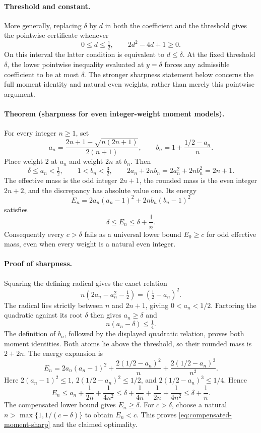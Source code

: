 \paragraph{Threshold and constant.}
More generally, replacing \(\delta\) by \(d\) in both the coefficient
and the threshold gives the pointwise certificate whenever
\[
 0\le d\le\tfrac12,\qquad 2d^2-4d+1\ge0.
\]
On this interval the latter condition is equivalent to \(d\le\delta\).
At the fixed threshold \(\delta\), the lower pointwise inequality
evaluated at \(y=\delta\) forces any admissible coefficient to be at
most \(\delta\).  The stronger sharpness statement below concerns
the full moment identity and natural even weights, rather than merely
this pointwise argument.

\paragraph{Theorem (sharpness for even integer-weight moment models).}
For every integer \(n\ge1\), set
\[
 a_n=\frac{2n+1-\sqrt{n(2n+1)}}{2(n+1)},\qquad
 b_n=1+\frac{1/2-a_n}{n}.
\]
Place weight \(2\) at \(a_n\) and weight \(2n\) at \(b_n\).  Then
\[
 \delta\le a_n<\tfrac12,\qquad 1<b_n<\tfrac32,\qquad
 2a_n+2nb_n=2a_n^2+2nb_n^2=2n+1.
\]
The effective mass is the odd integer \(2n+1\), the rounded mass is
the even integer \(2n+2\), and the discrepancy has absolute value one.
Its energy
\[
 E_n=2a_n(a_n-1)^2+2nb_n(b_n-1)^2
\]
satisfies
\begin{equation}
 \delta\le E_n\le\delta+\frac1n.
 \label{eq:compensated-moment-sharp}
\end{equation}
Consequently every \(c>\delta\) fails as a universal lower bound
\(E_0\ge c\) for odd effective mass, even when every weight is a natural
even integer.

\paragraph{Proof of sharpness.}
Squaring the defining radical gives the exact relation
\[
 n(2a_n-a_n^2-\tfrac12)=(\tfrac12-a_n)^2.
\]
The radical lies strictly between \(n\) and \(2n+1\), giving
\(0<a_n<1/2\).  Factoring the quadratic against its root \(\delta\)
then gives \(a_n\ge\delta\) and
\[
 n(a_n-\delta)\le\tfrac14.
\]
The definition of \(b_n\), followed by the displayed quadratic
relation, proves both moment identities.  Both atoms lie above
the threshold, so their rounded mass is \(2+2n\).
The energy expansion is
\[
 E_n=2a_n(a_n-1)^2+
       \frac{2(1/2-a_n)^2}{n}
       +\frac{2(1/2-a_n)^3}{n^2}.
\]
Here \(2(a_n-1)^2\le1\), \(2(1/2-a_n)^2\le1/2\), and
\(2(1/2-a_n)^3\le1/4\).  Hence
\[
 E_n\le a_n+\frac1{2n}+\frac1{4n^2}
 \le\delta+\frac1{4n}+\frac1{2n}+\frac1{4n^2}
 \le\delta+\frac1n.
\]
The compensated lower bound gives \(E_n\ge\delta\).
For \(c>\delta\), choose a natural \(n>\max\{1,1/(c-\delta)\}\)
to obtain \(E_n<c\).  This proves
\eqref{eq:compensated-moment-sharp} and the claimed optimality.

